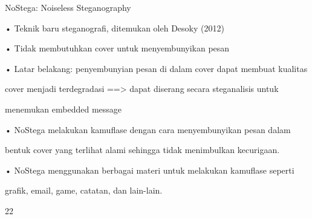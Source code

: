 \documentclass{article}
\begin{document}

NoStega: Noiseless Steganography

• Teknik baru steganografi, ditemukan oleh Desoky (2012)

• Tidak membutuhkan cover untuk menyembunyikan pesan

• Latar belakang: penyembunyian pesan di dalam cover dapat membuat kualitas 

cover menjadi terdegradasi ==> dapat diserang secara steganalisis untuk 

menemukan embedded message

• NoStega melakukan kamuflase dengan cara menyembunyikan pesan dalam 

bentuk cover yang terlihat alami sehingga tidak menimbulkan kecurigaan. 

• NoStega menggunakan berbagai materi untuk melakukan kamuflase seperti 

grafik, email, game, catatan, dan lain-lain.

22
\end{document}
